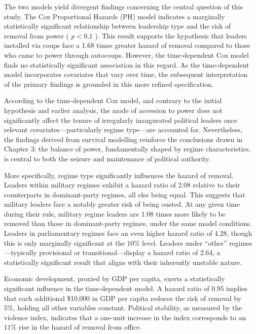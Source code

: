 \documentclass[
  12pt,
]{report}
\begin{document}
The two models yield divergent findings concerning the central question
of this study. The Cox Proportional Hazards (PH) model indicates a
marginally statistically significant relationship between leadership
type and the risk of removal from power ( \(p<0.1\) ). This result
supports the hypothesis that leaders installed via coups face a 1.68
times greater hazard of removal compared to those who came to power
through autocoups. However, the time-dependent Cox model finds no
statistically significant association in this regard. As the
time-dependent model incorporates covariates that vary over time, the
subsequent interpretation of the primary findings is grounded in this
more refined specification.

According to the time-dependent Cox model, and contrary to the initial
hypothesis and earlier analysis, the mode of accession to power does not
significantly affect the tenure of irregularly inaugurated political
leaders once relevant covariates---particularly regime type---are
accounted for. Nevertheless, the findings derived from survival
modelling reinforce the conclusions drawn in Chapter 3: the balance of
power, fundamentally shaped by regime characteristics, is central to
both the seizure and maintenance of political authority.

More specifically, regime type significantly influences the hazard of
removal. Leaders within military regimes exhibit a hazard ratio of 2.08
relative to their counterparts in dominant-party regimes, all else being
equal. This suggests that military leaders face a notably greater risk
of being ousted. At any given time during their rule, military regime
leaders are 1.08 times more likely to be removed than those in
dominant-party regimes, under the same model conditions. Leaders in
parliamentary regimes face an even higher hazard ratio of 4.28, though
this is only marginally significant at the \(10\%\) level. Leaders under
``other'' regimes---typically provisional or transitional---display a
hazard ratio of 2.64, a statistically significant result that aligns
with their inherently unstable nature.

Economic development, proxied by GDP per capita, exerts a statistically
significant influence in the time-dependent model. A hazard ratio of
0.95 implies that each additional \$10,000 in GDP per capita reduces the
risk of removal by \(5\%\), holding all other variables constant.
Political stability, as measured by the violence index, indicates that a
one-unit increase in the index corresponds to an \(11\%\) rise in the
hazard of removal from office.
\end{document}
